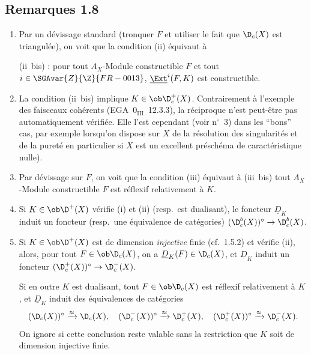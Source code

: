\subsection*{Remarques 1.8}
\begin{enumerate}[label=\alph*)]
\item Par un dévissage standard (tronquer $F$ et utiliser le fait que $\D_c(X)$ est triangulée), on voit que la condition (ii) équivaut à

(ii~bis) : pour tout $A_X$-Module constructible $F$ et tout $i \in \SGAvar{Z}{\Z}{FR-0013}$, $\underline{\Ext}^i(F,K)$ est constructible.

\item La condition (ii~bis) implique $K \in \ob \D_c^{+}(X)$. Contrairement à l'exemple des faisceaux cohérents (EGA~$0_{\mathrm{III}}$~12.3.3), la réciproque n'est peut-être pas automatiquement vérifiée. Elle l'est cependant (voir n${}^{\circ}$~3) dans les ``bons'' cas, par exemple lorsqu'on dispose sur $X$ de la résolution des singularités et de la
pureté en particulier si $X$ est un excellent préschéma de caractéristique nulle).

\item Par dévissage sur $F$, on voit que la condition (iii) équivaut à (iii~bis)  tout $A_X$-Module constructible $F$ est réflexif relativement à $K$.

\item Si $K \in \ob \D^{+}(X)$ vérifie (i) et (ii) (resp.~est dualisant), le foncteur $\underline{D}_K$ induit un foncteur (resp.~une équivalence de catégories) $(\D_c^{b}(X))^{\circ} \to \D_c^{b}(X)$.

\item Si $K \in \ob \D^{+}(X)$ est de dimension \emph{injective} finie (cf.~1.5.2) et vérifie (ii), alors, pour tout $F \in \ob \D_c(X)$, on a $\underline{D}_K(F) \in \D_c(X)$, et $\underline{D}_K$ induit un foncteur $(\D_c^{+}(X))^{\circ} \to \D_c^{-}(X)$.

Si en outre $K$ est dualisant, tout $F \in \ob \D_c(X)$ est réflexif relativement à $K$, et $\underline{D}_K$ induit des équivalences de catégories
\[
(\D_c(X))^{\circ} \xrightarrow{\approx} \D_c(X), \quad (\D_c^{-}(X))^{\circ} \xrightarrow{\approx} \D_c^{+}(X), \quad (\D_c^{+}(X))^{\circ} \xrightarrow{\approx} \D_c^{-}(X).
\]
On ignore si cette conclusion reste valable sans la restriction que $K$ soit de dimension injective finie.
\end{enumerate}

